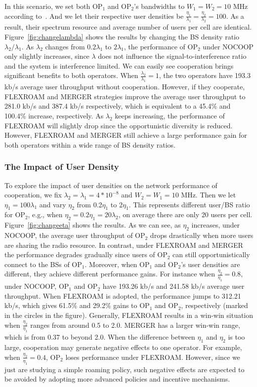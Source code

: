 \documentclass[conference]{IEEEtran}
\begin{document}
In this scenario, we set both OP$_1$ and OP$_2$'s bandwidths to $W_1 = W_2 = 10$ MHz according to~\cite{WiMAXEva}. And we let their respective user densities be $\frac{\eta_1}{\lambda_1} = \frac{\eta_2}{\lambda_2} = 100$. As a result, their spectrum resource and average number of users per cell are identical. Figure~\ref{fig:changelambda} shows the results by changing the BS density ratio $\lambda_2 / \lambda_1$. As $\lambda_2$ changes from $0.2 \lambda_1$ to $2 \lambda_1$, 	the performance of OP$_2$ under NOCOOP only slightly increases, since $\lambda$ does not influence the signal-to-interference ratio and the system is interference limited. We can easily see cooperation brings significant benefits to both operators. When $\frac{\lambda_2}{\lambda_1} = 1$, the two operators have 193.3 kb/s average user throughput without cooperation. However, if they cooperate, FLEXROAM and MERGER strategies improve the average user throughput to 281.0 kb/s and 387.4 kb/s respectively, which is equivalent to a 45.4\% and 100.4\% increase, respectively.  As $\lambda_2$ keeps increasing, the performance of FLEXROAM will slightly drop since the opportunistic diversity is reduced. However, FLEXROAM and MERGER still achieve a large performance gain for both operators within a wide range of BS density ratios.


\subsubsection{The Impact of User Density}

To explore the impact of user densities on the network performance of cooperation, we fix $\lambda_2 = \lambda_1 = 4*10^{-8}$ and $W_2 = W_1=10$ MHz. Then we let $\eta_1 = 100 \lambda_1$ and vary $\eta_2$ from 0.2$\eta_1$ to 2$\eta_1$. This represents different user/BS ratio for OP$_2$, e.g., when $\eta_2 = 0.2\eta_1=20\lambda_2$, on average there are only 20 users per cell.  Figure~\ref{fig:changeeta} shows the results. As we can see, as $\eta_2$ increases, under NOCOOP, the average user throughput of OP$_2$ drops drastically when more users are sharing the radio resource. In contrast, under FLEXROAM and MERGER the performance degrades gradually since users of OP$_2$ can still opportunistically connect to the BSs of OP$_1$. Moreover, when OP$_1$ and OP$_2$'s user densities are different, they achieve different performance gains. For instance when $\frac{\eta_2}{\eta_1} = 0.8$, under NOCOOP, OP$_1$ and OP$_2$ have 193.26 kb/s and 241.58 kb/s average user throughput. When FLEXROAM is adopted, the performance jumps to 312.21 kb/s, which gives 61.5\% and 29.2\% gains to OP$_1$ and OP$_2$, respectively (marked in the circles in the figure). Generally, FLEXROAM results in a win-win situation when $\frac{\eta_2}{\eta_1}$ ranges from around 0.5 to 2.0. MERGER has a larger win-win range, which is from 0.37 to beyond 2.0. When the difference between $\eta_1$ and $\eta_2$ is too large, cooperation may generate negative effects to one operator. For example, when $\frac{\eta_2}{\eta_1} = 0.4$, OP$_2$ loses performance under FLEXROAM. However, since we just are studying a simple roaming policy, such negative effects are expected to be avoided by adopting more advanced policies and incentive mechanisms.
\end{document}

